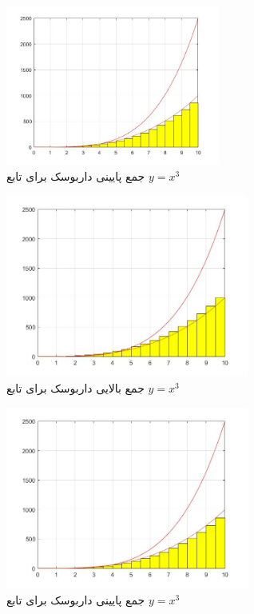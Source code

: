 \documentclass{article}
\begin{document}
\begin{figure}[!h]
    \centering
\includegraphics[width=7cm]{piccode10integral.jpg}
    \caption{جمع پایینی داربوسک برای تابع $y=x^3$}
    \label{fig:انتگرال خط}
\end{figure}

\begin{figure}[!h]
    \centering
\includegraphics[width=8cm]{piccode11integral.jpg}
    \caption{جمع بالایی داربوسک برای تابع $y=x^3$}
    \label{fig:انتگرال خط}
\end{figure}

\begin{figure}[!h]
    \centering
\includegraphics[width=8cm]{pic12codeIntegral.jpg}
    \caption{جمع پایینی داربوسک برای تابع $y=x^3$}
    \label{fig:انتگرال خط}
\end{figure}
\end{document}
